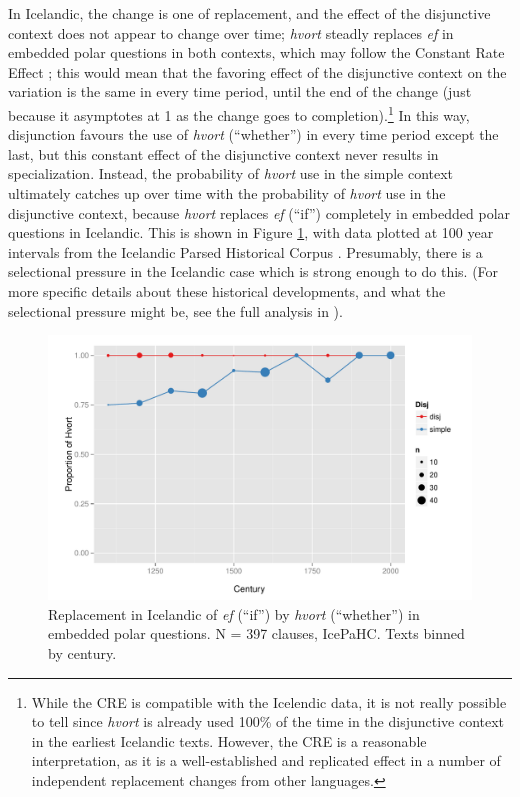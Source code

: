 In Icelandic, the change is one of replacement, and the effect of the disjunctive context does not appear to change over time; \textsl{hvort} steadly replaces \textsl{ef} in embedded polar questions in both contexts, which may follow the Constant Rate Effect \citep{kroch1989}; this would mean that the favoring effect of the disjunctive context on the variation is the same in every time period, until the end of the change (just because it asymptotes at 1 as the change goes to completion).\footnote{While the CRE is compatible with the Icelendic data, it is not really possible to tell since \textsl{hvort} is already used 100\% of the time in the disjunctive context in the earliest Icelandic texts.
However, the CRE is a reasonable interpretation, as it is a well-established and replicated effect in a number of independent replacement changes from other languages.}
In this way, disjunction favours the use of \textsl{hvort} (``whether'') in every time period except the last, but this constant effect of the disjunctive context never results in specialization.
Instead, the probability of \textsl{hvort} use in the simple context ultimately catches up over time with the probability of \textsl{hvort} use in the disjunctive context, because \textsl{hvort} replaces \textsl{ef} (``if'') completely in embedded polar questions in Icelandic.
This is shown in Figure \ref{hvort}, with data plotted at 100 year intervals from the Icelandic Parsed Historical Corpus \citep[IcePaHC][]{icepahc09}.
Presumably, there is a selectional pressure in the Icelandic case which is strong enough to do this.
(For more specific details about these historical developments, and what the selectional pressure might be, see the full analysis in ).


\begin{figure}
    \begin{center}
    \includegraphics[scale=.7]{whetherifIce.pdf}
    \caption{Replacement in Icelandic of \textsl{ef} (``if'') by \textsl{hvort} (``whether'') in embedded polar questions. N = 397 clauses, IcePaHC. Texts binned by century.}
       \label{hvort}
    \end{center}
\end{figure}

